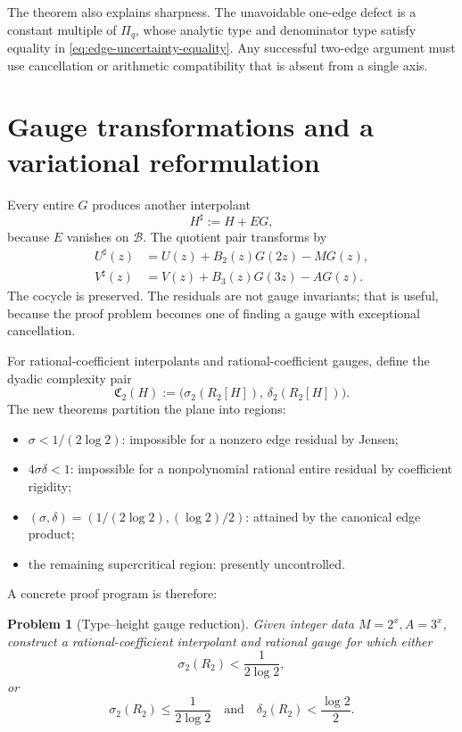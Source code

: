 \documentclass[11pt]{article}
\newtheorem{problem}[theorem]{Problem}
\theoremstyle{definition}
\newcommand{\cB}{\mathcal B}
\begin{document}
The theorem also explains sharpness.  The unavoidable one-edge defect is a constant multiple of \(\Pi_q\), whose analytic type and denominator type satisfy equality in \eqref{eq:edge-uncertainty-equality}.  Any successful two-edge argument must use cancellation or arithmetic compatibility that is absent from a single axis.

\section{Gauge transformations and a variational reformulation}\label{sec:gauge}

Every entire \(G\) produces another interpolant
\[
  H^\sharp:=H+EG,
\]
because \(E\) vanishes on \(\cB\).  The quotient pair transforms by
\begin{align}
  U^\sharp(z)&=U(z)+B_2(z)G(2z)-M G(z),\label{eq:gauge-U}\\
  V^\sharp(z)&=V(z)+B_3(z)G(3z)-A G(z).
  \label{eq:gauge-V}
\end{align}
The cocycle is preserved.  The residuals are not gauge invariants; that is useful, because the proof problem becomes one of finding a gauge with exceptional cancellation.

For rational-coefficient interpolants and rational-coefficient gauges, define the dyadic complexity pair
\[
  \mathfrak C_2(H):=
  \bigl(\sigma_2(R_2[H]),\,\delta_2(R_2[H])\bigr).
\]
The new theorems partition the plane into regions:
\begin{itemize}
\item \(\sigma<1/(2\log2)\): impossible for a nonzero edge residual by Jensen;
\item \(4\sigma\delta<1\): impossible for a nonpolynomial rational entire residual by coefficient rigidity;
\item \((\sigma,\delta)=(1/(2\log2),(\log2)/2)\): attained by the canonical edge product;
\item the remaining supercritical region: presently uncontrolled.
\end{itemize}

A concrete proof program is therefore:
\begin{problem}[Type--height gauge reduction]\label{prob:gauge-reduction}
Given integer data \(M=2^x,A=3^x\), construct a rational-coefficient interpolant and rational gauge for which either
\[
  \sigma_2(R_2)<\frac1{2\log2},
\]
or
\[
  \sigma_2(R_2)\le\frac1{2\log2}
  \quad\text{and}\quad
  \delta_2(R_2)<\frac{\log2}{2}.
\]
\end{problem}
\end{document}
